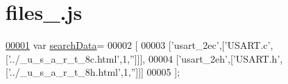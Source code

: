 \hypertarget{files__9_8js_source}{}\section{files\+\_.\+js}
\label{files__9_8js_source}

\begin{DoxyCode}
\hypertarget{files__9_8js_source.tex_l00001}{}\hyperlink{files__9_8js_ad01a7523f103d6242ef9b0451861231e}{00001} var \hyperlink{files__9_8js_ad01a7523f103d6242ef9b0451861231e}{searchData}=
00002 [
00003   [\textcolor{stringliteral}{'usart\_2ec'},[\textcolor{stringliteral}{'USART.c'},[\textcolor{stringliteral}{'../\_u\_s\_a\_r\_t\_8c.html'},1,\textcolor{stringliteral}{''}]]],
00004   [\textcolor{stringliteral}{'usart\_2eh'},[\textcolor{stringliteral}{'USART.h'},[\textcolor{stringliteral}{'../\_u\_s\_a\_r\_t\_8h.html'},1,\textcolor{stringliteral}{''}]]]
00005 ];
\end{DoxyCode}

